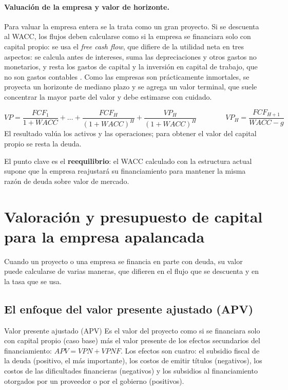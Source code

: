 \paragraph{Valuación de la empresa y valor de horizonte.} Para valuar la empresa entera se la trata como un gran proyecto. Si se descuenta al WACC, los flujos deben calcularse como si la empresa se financiara solo con capital propio: se usa el \emph{free cash flow}, que difiere de la utilidad neta en tres aspectos: se calcula antes de intereses, suma las depreciaciones y otros gastos no monetarios, y resta los gastos de capital y la inversión en capital de trabajo, que no son gastos contables . Como las empresas son prácticamente inmortales, se proyecta un horizonte de mediano plazo y se agrega un valor terminal, que suele concentrar la mayor parte del valor y debe estimarse con cuidado.

\begin{formulaBox}
\[
VP = \frac{FCF_1}{1+WACC} + \dots + \frac{FCF_H}{(1+WACC)^H} + \frac{VP_H}{(1+WACC)^H}
\qquad\qquad
VP_H = \frac{FCF_{H+1}}{WACC - g}
\]
El resultado valúa los activos y las operaciones; para obtener el valor del capital propio se resta la deuda.
\end{formulaBox}

El punto clave es el \textbf{reequilibrio}: el WACC calculado con la estructura actual supone que la empresa reajustará su financiamiento para mantener la misma razón de deuda sobre valor de mercado.

\section{Valoración y presupuesto de capital para la empresa apalancada}\label{sec:u3-metodos}

Cuando un proyecto o una empresa se financia en parte con deuda, su valor puede calcularse de varias maneras, que difieren en el flujo que se descuenta y en la tasa que se usa.

\subsection{El enfoque del valor presente ajustado (APV)}

\begin{definicion}{Valor presente ajustado (APV)}
Es el valor del proyecto como si se financiara solo con capital propio (caso base) más el valor presente de los efectos secundarios del financiamiento: $APV = VPN + VPNF$. Los efectos son cuatro: el subsidio fiscal de la deuda (positivo, el más importante), los costos de emitir títulos (negativos), los costos de las dificultades financieras (negativos) y los subsidios al financiamiento otorgados por un proveedor o por el gobierno (positivos).
\end{definicion}


